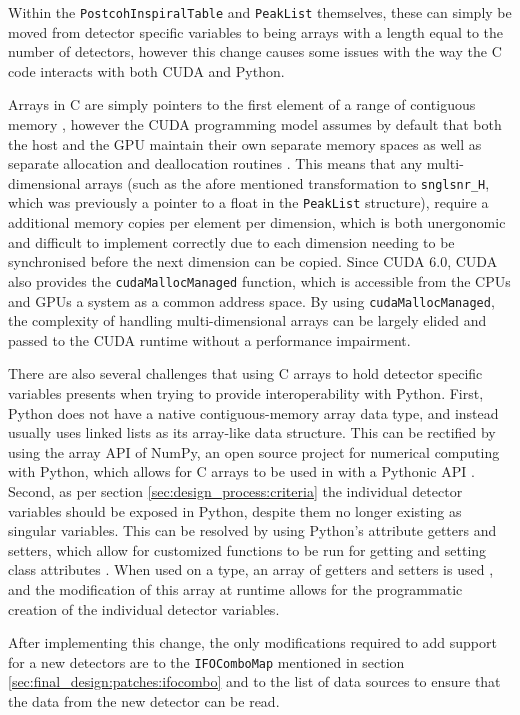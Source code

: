 \documentclass{article}
\begin{document}
Within the \texttt{PostcohInspiralTable} and \texttt{PeakList} themselves, these can simply be moved from detector specific variables to being arrays with a length equal to the number of detectors, however this change causes some issues with the way the C code interacts with both CUDA and Python.

Arrays in C are simply pointers to the first element of a range of contiguous memory \cite{cpplang}, however the CUDA programming model assumes by default that both the host and the GPU maintain their own separate memory spaces as well as separate allocation and deallocation routines \cite{CUDA_Guide}.
This means that any multi-dimensional arrays (such as the afore mentioned transformation to \texttt{snglsnr\_H}, which was previously a pointer to a float in the \texttt{PeakList} structure), require a additional memory copies per element per dimension, which is both unergonomic and difficult to implement correctly due to each dimension needing to be synchronised before the next dimension can be copied.
Since CUDA 6.0, CUDA also provides the \texttt{cudaMallocManaged} function, which is accessible from the CPUs and GPUs a system as a common address space.
By using \texttt{cudaMallocManaged}, the complexity of handling multi-dimensional arrays can be largely elided and passed to the CUDA runtime without a performance impairment.

There are also several challenges that using C arrays to hold detector specific variables presents when trying to provide interoperability with Python.
First, Python does not have a native contiguous-memory array data type, and instead usually uses linked lists as its array-like data structure.
This can be rectified by using the array API of NumPy, an open source project for numerical computing with Python, which allows for C arrays to be used in with a Pythonic API \cite{nparray}.
Second, as per section \ref{sec:design_process:criteria} the individual detector variables should be exposed in Python, despite them no longer existing as singular variables.
This can be resolved by using Python's attribute getters and setters, which allow for customized functions to be run for getting and setting class attributes \cite{pygetset}.
When used on a type, an array of getters and setters is used \cite{pytype_getset}, and the modification of this array at runtime allows for the programmatic creation of the individual detector variables.

After implementing this change, the only modifications required to add support for a new detectors are to the \texttt{IFOComboMap} mentioned in section \ref{sec:final_design:patches:ifocombo} and to the list of data sources to ensure that the data from the new detector can be read.
\end{document}

